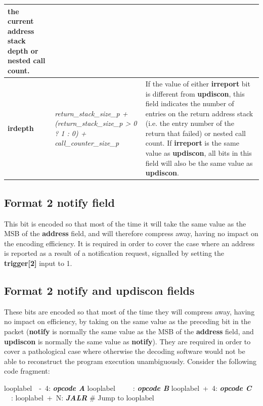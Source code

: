\begin{table}[!h]
\begin{tabulary}{\textwidth}{|l|p{35mm}|p{90mm}|}
                the current address stack depth or nested call count. \\
    \hline
    \textbf{irdepth}	& \textit {return\_stack\_size\_p + (return\_stack\_size\_p > 0 ? 1 : 0) + call\_counter\_size\_p} & 
                If the value of either \textbf{irreport} bit is different from \textbf{updiscon}, this field 
				indicates the number of entries on the return address stack (i.e. the entry number of the return that
                failed) or nested call count.  If \textbf{irreport} is the same value as \textbf{updiscon}, 
                all bits in this field  will also be the same value as \textbf{updiscon}. \\
    \hline
  \end{tabulary}
\end{table}

\subsection{Format 2 \textbf{notify} field} \label{sec:notify}

This bit is encoded so that most of the time it will take the same value as the MSB of the \textbf{address} field,
and will therefore compress away, having no impact on the encoding efficiency.  It is required in order to cover 
the case where an address is reported as a result of a notification request, signalled by setting the 
\textbf{trigger[2]} input to 1. 


\subsection{Format 2 \textbf{notify} and \textbf{updiscon} fields} \label{sec:updiscon}

These bits are encoded so that most of the time they will compress away, having no impact on efficiency, by taking on 
the same value as the preceding bit in the packet (\textbf{notify} is normally the same value as the MSB of the 
\textbf{address} field, and \textbf{updiscon} is normally the same value as \textbf{notify}).  They are required in
order to cover a pathological case where otherwise the decoding software would not be able to reconstruct the program 
execution unambiguously. Consider the following code fragment:

looplabel~~-~4: \textbf{\textit{opcode A}} \newline
looplabel~~~~~: \textbf{\textit{opcode B}} \newline
looplabel~+~4: \textbf{\textit{opcode C}} \newline
~~: \newline
looplabel~+~N: \textbf{\textit{JALR}} \# Jump to looplabel\newline

